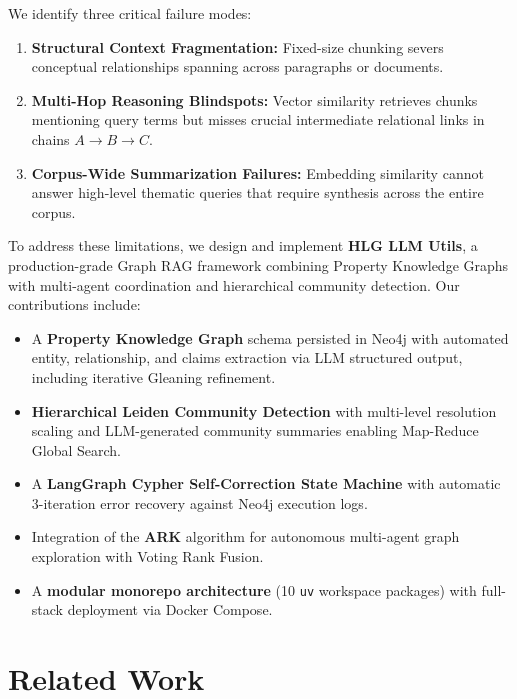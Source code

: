 \documentclass[11pt]{article}
\begin{document}
We identify three critical failure modes:
\begin{enumerate}[leftmargin=*]
    \item \textbf{Structural Context Fragmentation:} Fixed-size chunking severs conceptual relationships spanning across paragraphs or documents.
    \item \textbf{Multi-Hop Reasoning Blindspots:} Vector similarity retrieves chunks mentioning query terms but misses crucial intermediate relational links in chains $A \to B \to C$.
    \item \textbf{Corpus-Wide Summarization Failures:} Embedding similarity cannot answer high-level thematic queries that require synthesis across the entire corpus.
\end{enumerate}

To address these limitations, we design and implement \textbf{HLG LLM Utils}, a production-grade Graph RAG framework combining Property Knowledge Graphs with multi-agent coordination and hierarchical community detection. Our contributions include:

\begin{itemize}[leftmargin=*]
    \item A \textbf{Property Knowledge Graph} schema persisted in Neo4j with automated entity, relationship, and claims extraction via LLM structured output, including iterative Gleaning refinement.
    \item \textbf{Hierarchical Leiden Community Detection} with multi-level resolution scaling and LLM-generated community summaries enabling Map-Reduce Global Search.
    \item A \textbf{LangGraph Cypher Self-Correction State Machine} with automatic 3-iteration error recovery against Neo4j execution logs.
    \item Integration of the \textbf{ARK} algorithm \citep{polonuer2026ark} for autonomous multi-agent graph exploration with Voting Rank Fusion.
    \item A \textbf{modular monorepo architecture} (10 \texttt{uv} workspace packages) with full-stack deployment via Docker Compose.
\end{itemize}

\section{Related Work}
\end{document}
